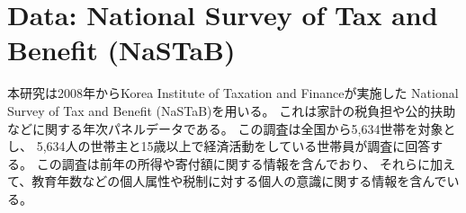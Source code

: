 \documentclass[
  11pt,
  a4paper,
]{article}
\begin{document}
\hypertarget{nastab}{%
\section{Data: National Survey of Tax and Benefit (NaSTaB)}\label{nastab}}

本研究は2008年からKorea Institute of Taxation and Financeが実施した
National Survey of Tax and Benefit (NaSTaB)を用いる。
これは家計の税負担や公的扶助などに関する年次パネルデータである。
この調査は全国から5,634世帯を対象とし、
5,634人の世帯主と15歳以上で経済活動をしている世帯員が調査に回答する。
この調査は前年の所得や寄付額に関する情報を含んでおり、
それらに加えて、教育年数などの個人属性や税制に対する個人の意識に関する情報を含んでいる。

\begin{table}


\end{table}
\end{document}
